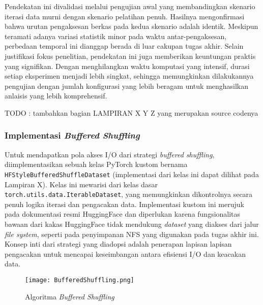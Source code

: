 Pendekatan ini divalidasi melalui pengujian awal yang membandingkan skenario iterasi data murni dengan skenario pelatihan penuh. Hasilnya mengonfirmasi bahwa urutan pengaksesan berkas pada kedua skenario adalah identik. Meskipun teramati adanya variasi statistik minor pada waktu antar-pengaksesan, perbedaan temporal ini dianggap berada di luar cakupan tugas akhir. Selain justifikasi fokus penelitian, pendekatan ini juga memberikan keuntungan praktis yang signifikan. Dengan menghilangkan waktu komputasi yang intensif, durasi setiap eksperimen menjadi lebih singkat, sehingga memungkinkan dilakukannya pengujian dengan jumlah konfigurasi yang lebih beragam untuk menghasilkan anlaisis yang lebih komprehensif.

TODO : tambahkan bagian LAMPIRAN X Y Z yang merupakan source codenya
\subsubsection{Implementasi \textit{Buffered Shuffling}}
\begin{sloppypar}
Untuk mendapatkan pola akses I/O dari strategi \textit{buffered shuffling}, diimplementasikan sebuah kelas PyTorch kustom bernama \texttt{HFStyleBufferedShuffleDataset} (implementasi dari kelas ini dapat dilihat pada Lampiran X). Kelas ini mewarisi dari kelas dasar \texttt{torch.utils.data.IterableDataset}, yang memungkinkan dikontrolnya secara penuh logika iterasi dan pengacakan data. Implementasi kustom ini merujuk pada dokumentasi resmi HuggingFace \parencite{HuggingFaceIterableDataset} dan diperlukan karena fungsionalitas bawaan dari kakas HuggingFace tidak mendukung \textit{dataset} yang diakses dari jalur \textit{file system}, seperti pada penyimpanan NFS yang digunakan pada tugas akhir ini. Konsep inti dari strategi yang diadopsi adalah penerapan lapisan lapisan pengacakan untuk mencapai keseimbangan antara efisiensi I/O dan keacakan data.
\end{sloppypar}

\begin{figure}[t]
    \centering
    \texttt{[image: BufferedShuffling.png]}
    \caption{Algoritma \textit{Buffered Shuffling}}
    \label{fig:BufferedShuffling}
\end{figure}

